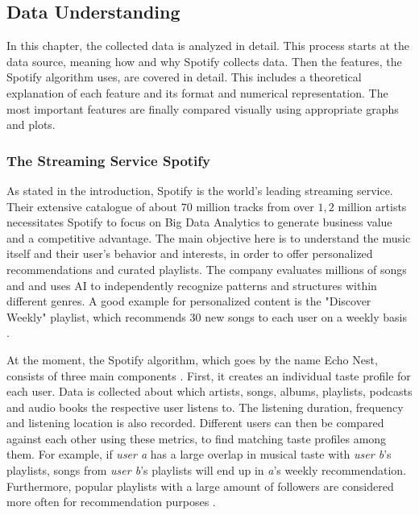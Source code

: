 \subsection{Data Understanding}

In this chapter, the collected data is analyzed in detail.
This process starts at the data source, meaning how and why Spotify collects data.
Then the features, the Spotify algorithm uses, are covered in detail.
This includes a theoretical explanation of each feature and its format and numerical representation.
The most important features are finally compared visually using appropriate graphs and plots.

\subsubsection{The Streaming Service Spotify}
As stated in the introduction, Spotify is the world's leading streaming service.
Their extensive catalogue of about \(70\) million tracks from over \(1,2\) million artists
necessitates Spotify to focus on Big Data Analytics to generate business value and a competitive advantage.
The main objective here is to understand the music itself and their user's behavior and interests,
in order to offer personalized recommendations and curated playlists.
The company evaluates millions of songs and and uses AI to independently recognize
patterns and structures within different genres. 
A good example for personalized content is the "Discover Weekly" playlist, which recommends 30 new songs
to each user on a weekly basis \cite{L.Rabe2021}. 

At the moment, the Spotify algorithm, which goes by the name Echo Nest,
consists of three main components \cite{Stephenson2021}.
First, it creates an individual taste profile for each user. 
Data is collected about which artists, songs, albums, playlists, podcasts and audio books the
respective user listens to. The listening duration, frequency and listening location is also recorded.
Different users can then be compared against each other using these metrics, to find matching 
taste profiles among them.
For example, if \emph{user a} has a large overlap in musical taste with \emph{user b}'s playlists,
songs from \emph{user b}'s playlists will end up in \emph{a}'s weekly recommendation.
Furthermore, popular playlists with a large amount of followers are considered more often for recommendation purposes \cite[]{Stephenson2021}.

